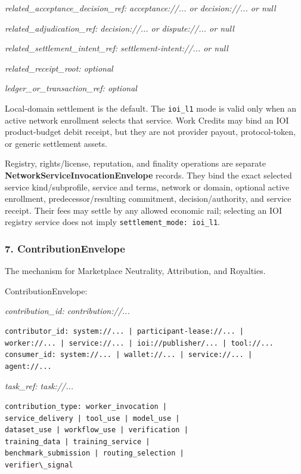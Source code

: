 \documentclass[
  11pt,
]{article}
\begin{document}
\emph{related\_acceptance\_decision\_ref: acceptance://... or decision://... or null}

\emph{related\_adjudication\_ref: decision://... or dispute://... or null}

\emph{related\_settlement\_intent\_ref: settlement-intent://... or null}

\emph{related\_receipt\_root: optional}

\emph{ledger\_or\_transaction\_ref: optional}

Local-domain settlement is the default. The \texttt{ioi\_l1} mode is valid
only when an active network enrollment selects that service. Work Credits may
bind an IOI product-budget debit receipt, but they are not provider payout,
protocol-token, or generic settlement assets.

Registry, rights/license, reputation, and finality operations are separate
\textbf{NetworkServiceInvocationEnvelope} records. They bind the exact selected
service kind/subprofile, service and terms, network or domain, optional active
enrollment, predecessor/resulting commitment, decision/authority, and service
receipt. Their fees may settle by any allowed economic rail; selecting an IOI
registry service does not imply \texttt{settlement\_mode: ioi\_l1}.

\hypertarget{contributionenvelope}{%
\subsubsection{7. ContributionEnvelope}\label{contributionenvelope}}

The mechanism for Marketplace Neutrality, Attribution, and Royalties.

ContributionEnvelope:

\emph{contribution\_id: contribution://...}

\begin{lstlisting}[language={},basicstyle=\ttfamily\scriptsize]
contributor_id: system://... | participant-lease://... |
worker://... | service://... | ioi://publisher/... | tool://...
consumer_id: system://... | wallet://... | service://... |
agent://...
\end{lstlisting}
\emph{task\_ref: task://...}

\begin{lstlisting}[language={},basicstyle=\ttfamily\scriptsize]
contribution_type: worker_invocation |
service_delivery | tool_use | model_use |
dataset_use | workflow_use | verification |
training_data | training_service |
benchmark_submission | routing_selection |
verifier\_signal
\end{lstlisting}
\end{document}
